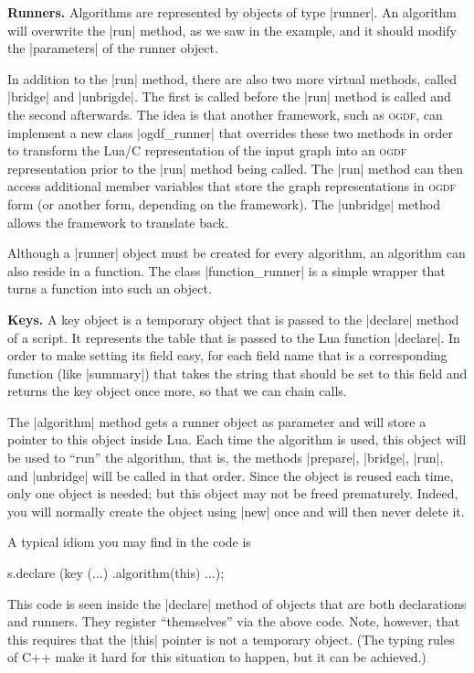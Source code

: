 \medskip
\noindent\textbf{Runners.}
Algorithms are represented by objects of type |runner|. An
algorithm will overwrite the |run| method, as we saw in the
example, and it should modify the |parameters| of the runner
object. 

In addition to the |run| method, there are also two more virtual
methods, called |bridge| and |unbrigde|. The first is called before
the |run| method is called and the second afterwards. The idea is that
another framework, such as \textsc{ogdf}, can implement a new class
|ogdf_runner| that overrides these two methods in order to transform
the Lua/C representation of the input graph into an \textsc{ogdf}
representation prior to the |run| method being called. The |run|
method can then access additional member variables that store the
graph representations in \textsc{ogdf} form (or another form,
depending on the framework). The |unbridge| method allows the
framework to translate back.

Although a |runner| object must be created for every algorithm, an
algorithm can also reside in a function. The class |function_runner|
is a simple wrapper that turns a function into such an object.


\medskip
\noindent\textbf{Keys.}
A key object is a temporary object that is passed to the |declare|
method of a script. It represents the table that is passed to the Lua
function |declare|. In order to make setting its field easy, for each
field name that is a corresponding function (like |summary|) that
takes the string that should be set to this field and returns the key
object once more, so that we can chain calls.

The |algorithm| method gets a runner object as parameter and will
store a pointer to this object inside Lua. Each time the algorithm is
used, this object will be used to ``run'' the algorithm, that is, the
methods |prepare|, |bridge|, |run|, and |unbridge| will be called in
that order. Since the object is reused each time, only one object is
needed; but this object may not be freed prematurely. Indeed, you will
normally create the object using |new| once and will then never delete
it.

A typical idiom you may find in the code is
\begin{codeexample}
s.declare (key (...)
           .algorithm(this)
           ...);  
\end{codeexample}
This code is seen inside the |declare| method of objects that are both
declarations and runners. They register ``themselves'' via the above
code. Note, however, that this requires that the |this| pointer is not
a temporary object. (The typing rules of C++ make it hard for this
situation to happen, but it can be achieved.)


